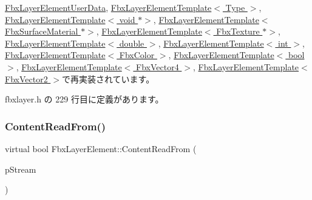 \hyperlink{class_fbx_layer_element_user_data_aa945631c932f3c811013c903e5ecf55e}{Fbx\+Layer\+Element\+User\+Data}, \hyperlink{class_fbx_layer_element_template_abe029dd81aa956b415b9534aa3536bf0}{Fbx\+Layer\+Element\+Template$<$ Type $>$}, \hyperlink{class_fbx_layer_element_template_abe029dd81aa956b415b9534aa3536bf0}{Fbx\+Layer\+Element\+Template$<$ void $\ast$$>$}, \hyperlink{class_fbx_layer_element_template_abe029dd81aa956b415b9534aa3536bf0}{Fbx\+Layer\+Element\+Template$<$ Fbx\+Surface\+Material $\ast$$>$}, \hyperlink{class_fbx_layer_element_template_abe029dd81aa956b415b9534aa3536bf0}{Fbx\+Layer\+Element\+Template$<$ Fbx\+Texture $\ast$$>$}, \hyperlink{class_fbx_layer_element_template_abe029dd81aa956b415b9534aa3536bf0}{Fbx\+Layer\+Element\+Template$<$ double $>$}, \hyperlink{class_fbx_layer_element_template_abe029dd81aa956b415b9534aa3536bf0}{Fbx\+Layer\+Element\+Template$<$ int $>$}, \hyperlink{class_fbx_layer_element_template_abe029dd81aa956b415b9534aa3536bf0}{Fbx\+Layer\+Element\+Template$<$ Fbx\+Color $>$}, \hyperlink{class_fbx_layer_element_template_abe029dd81aa956b415b9534aa3536bf0}{Fbx\+Layer\+Element\+Template$<$ bool $>$}, \hyperlink{class_fbx_layer_element_template_abe029dd81aa956b415b9534aa3536bf0}{Fbx\+Layer\+Element\+Template$<$ Fbx\+Vector4 $>$}, \hyperlink{class_fbx_layer_element_template_abe029dd81aa956b415b9534aa3536bf0}{Fbx\+Layer\+Element\+Template$<$ Fbx\+Vector2 $>$}で再実装されています。



 fbxlayer.\+h の 229 行目に定義があります。

\mbox{\label{class_fbx_layer_element_a407c679ef12336f2cf916f598053bf02}} 
\subsubsection{\texorpdfstring{Content\+Read\+From()}{ContentReadFrom()}}
{\footnotesize\ttfamily virtual bool Fbx\+Layer\+Element\+::\+Content\+Read\+From (\begin{DoxyParamCaption}\item[{const \hyperlink{class_fbx_stream}{Fbx\+Stream} \&}]{p\+Stream }\end{DoxyParamCaption})\hspace{0.3cm}{\ttfamily [virtual]}}



